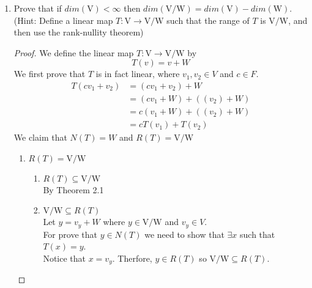 \documentclass[11pt]{scrartcl}
\begin{document}
\begin{enumerate}[label=\alph*.]
	\item{
	      Prove that if $dim(\mathrm{V}) < \infty$ then $dim(\mathrm{V}/\mathrm{W}) = dim(\mathrm{V}) - dim(\mathrm{W})$.
	      (Hint: Define a linear map $T:\mathrm{V} \rightarrow \mathrm{V}/\mathrm{W}$ such that the range of $T$ is $\mathrm{V}/\mathrm{W}$, and then use the rank-nullity theorem)
	      \begin{proof}We define the linear map $T:\mathrm{V} \rightarrow \mathrm{V}/\mathrm{W}$ by \[T(v) = v + W\]
		      We first prove that $T$ is in fact linear, where $v_1,v_2 \in V$ and $c \in F$.
		      \begin{align*}
			      T(cv_1 + v_2) & = (cv_1 + v_2) + W         \\
			                    & =  (cv_1 + W)+ ((v_2) + W) \\
			                    & =  c(v_1 + W)+ ((v_2) + W) \\
			                    & =  cT(v_1)+ T(v_2)
		      \end{align*}
		      We claim that $N(T) = W$ and $R(T) = \mathrm{V}/\mathrm{W}$
		      \begin{enumerate}[label=\arabic*.]
			      \item{
			            $R(T) = \mathrm{V}/\mathrm{W}$
			            \begin{enumerate}[label=\roman*.]
				            \item{
				                  $R(T) \subseteq \mathrm{V}/\mathrm{W}$\\
				                  By Theorem 2.1\\
				                  }
				            \item{
				                  $\mathrm{V}/\mathrm{W} \subseteq R(T)$\\
				                  Let $y = v_y + W$ where $y \in \mathrm{V}/\mathrm{W}$ and $v_y \in V$.\\
				                  For prove that $y \in N(T)$ we need to show that  $\exists x$ such that $ T(x) = y$.\\
				                  Notice that $x = v_y$. Therfore, $y \in R(T)$ so $\mathrm{V}/\mathrm{W} \subseteq R(T)$.

}
\end{enumerate}}
\end{enumerate}
\end{proof}}
\end{enumerate}
\end{document}
